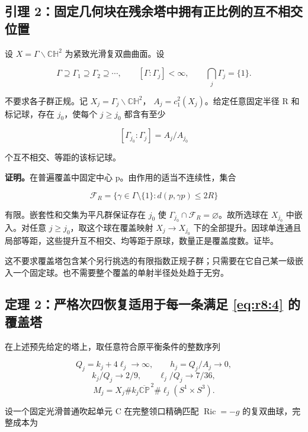 \documentclass[UTF8,11pt,fontset=none]{ctexart}
\begin{document}
\subsection{引理 2：固定几何块在残余塔中拥有正比例的互不相交位置}\label{ch8:ux5f15ux7406-2ux56faux5b9aux51e0ux4f55ux5757ux5728ux6b8bux4f59ux5854ux4e2dux62e5ux6709ux6b63ux6bd4ux4f8bux7684ux4e92ux4e0dux76f8ux4ea4ux4f4dux7f6e}

设 \(X=\Gamma\backslash\mathbb{CH}^2\) 为紧致光滑复双曲曲面。设

\[
\Gamma\supseteq\Gamma_1\supseteq\Gamma_2\supseteq\cdots,
\qquad [\Gamma:\Gamma_j]<\infty,
\qquad \bigcap_j\Gamma_j=\{1\}.
\tag{8.4}\label{eq:r8:4}
\]

不要求各子群正规。记 \(X_j=\Gamma_j\backslash\mathbb{CH}^2\)， \(A_j=c_1^2(X_j)\)。给定任意固定半径 R 和标记球，存在 \(j_0\)，使每个 \(j\ge j_0\) 都含有至少

\[
[\Gamma_{j_0}:\Gamma_j]=A_j/A_{j_0}
\]

个互不相交、等距的该标记球。

\textbf{证明。}在普遍覆盖中固定中心 p。由作用的适当不连续性，集合

\[
\mathcal F_R=\{\gamma\in\Gamma\setminus\{1\}:d(p,\gamma p)\le2R\}
\]

有限。嵌套性和交集为平凡群保证存在 \(j_0\) 使 \(\Gamma_{j_0}\cap\mathcal F_R=\varnothing\)。故所选球在 \(X_{j_0}\) 中嵌入。对任意 \(j\ge j_0\)，取这个球在覆盖映射 \(X_j\to X_{j_0}\) 下的全部提升。因球单连通且局部等距，这些提升互不相交、均等距于原球，数量正是覆盖度数。证毕。

这不要求覆盖塔包含某个另行挑选的有限指数正规子群；只需要在它自己某一级嵌入一个固定球。也不需要整个覆盖的单射半径处处趋于无穷。

\subsection{\texorpdfstring{定理 2：严格次四恢复适用于每一条满足 \eqref{eq:r8:4} 的覆盖塔}{定理 2：严格次四恢复适用于每一条满足  的覆盖塔}}\label{ch8:ux5b9aux7406-2ux4e25ux683cux6b21ux56dbux6062ux590dux9002ux7528ux4e8eux6bcfux4e00ux6761ux6ee1ux8db3-ux7684ux8986ux76d6ux5854}

在上述预先给定的塔上，取任意符合原平衡条件的整数序列

\[
Q_j=k_j+4\ell_j\to\infty,\qquad h_j=Q_j/A_j\to0,
\] \[
k_j/Q_j\to2/9,\qquad \ell_j/Q_j\to7/36,
\] \[
M_j=X_j\#k_j\overline{\mathbb{CP}}^{\,2}
\#\ell_j(S^1\times S^3).
\]

设一个固定光滑普通吹起单元 C 在完整领口精确匹配 \(\operatorname{Ric}=-g\) 的复双曲球，完整成本为
\end{document}
